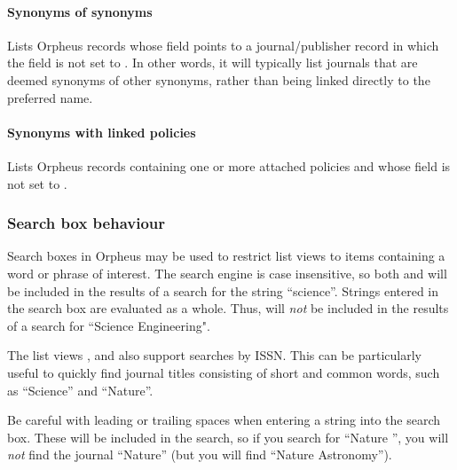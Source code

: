 \documentclass[british, 12pt]{article}
\begin{document}
\paragraph{Synonyms of synonyms} Lists Orpheus records whose  field points to a journal/publisher record in which the   field is not set to . In other words,  it will typically list journals that are deemed synonyms of other synonyms, rather than being linked directly to the preferred name.

\paragraph{Synonyms with linked policies} Lists Orpheus records containing one or more attached policies and whose  field is not set to .

\subsubsection{Search box behaviour}
\label{sec-search-behaviour}
Search boxes in Orpheus may be used to restrict list views to items containing a word or phrase of interest. The search engine is case insensitive, so both  and  will be included in the results of a search for the string ``science''. Strings entered in the search box are evaluated as a whole. Thus,  will \emph{not} be included in the results of a search for ``Science Engineering".

\begin{tip}
  The list views ,  and  also support searches by ISSN. This can be particularly useful to quickly find journal titles consisting of short and common words, such as ``Science'' and ``Nature''.
\end{tip}



\begin{warn}
 Be careful with leading or trailing spaces when entering a string into the search box. These will be included in the search, so if you search for ``Nature '', you will \emph{not} find the journal ``Nature'' (but you will find ``Nature Astronomy'').
\end{warn}
\end{document}
